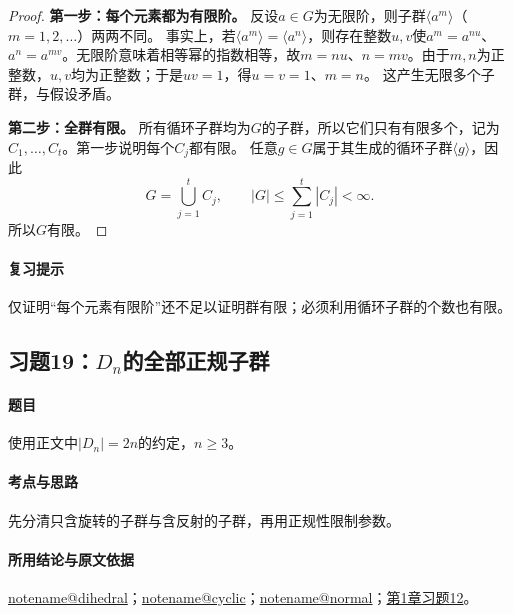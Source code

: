 \documentclass[UTF8,a4paper,11pt,fontset=windows]{ctexart}
\makeatletter
\newcommand{\noteref}[1]{\hyperref[note:#1]{\csname notename@#1\endcsname}}
\newcommand{\exref}[2]{\hyperref[ex:#1:#2]{第#1章习题#2}}
\makeatother
\begin{document}

\begin{proof}
\textbf{第一步：每个元素都为有限阶。}
反设$a\in G$为无限阶，则子群$\langle a^m\rangle$（$m=1,2,\ldots$）两两不同。
事实上，若$\langle a^m\rangle=\langle a^n\rangle$，则存在整数$u,v$使$a^m=a^{nu}$、$a^n=a^{mv}$。无限阶意味着相等幂的指数相等，故$m=nu$、$n=mv$。由于$m,n$为正整数，$u,v$均为正整数；于是$uv=1$，得$u=v=1$、$m=n$。
这产生无限多个子群，与假设矛盾。

\textbf{第二步：全群有限。}
所有循环子群均为$G$的子群，所以它们只有有限多个，记为$C_1,\ldots,C_t$。第一步说明每个$C_j$都有限。
任意$g\in G$属于其生成的循环子群$\langle g\rangle$，因此
\[
G=\bigcup_{j=1}^{t}C_j,\qquad |G|\leq\sum_{j=1}^{t}|C_j|<\infty.
\]
所以$G$有限。
\end{proof}

\paragraph{复习提示}
仅证明“每个元素有限阶”还不足以证明群有限；必须利用循环子群的个数也有限。


\subsection{习题19：\texorpdfstring{$D_n$的全部正规子群}{Dn的全部正规子群}}
\label{ex:1:19}

\paragraph{题目}
使用正文中$|D_n|=2n$的约定，$n\geq3$。

\paragraph{考点与思路}
先分清只含旋转的子群与含反射的子群，再用正规性限制参数。

\paragraph{所用结论与原文依据}
\noteref{dihedral}；\noteref{cyclic}；\noteref{normal}；\exref{1}{12}。

\end{document}
